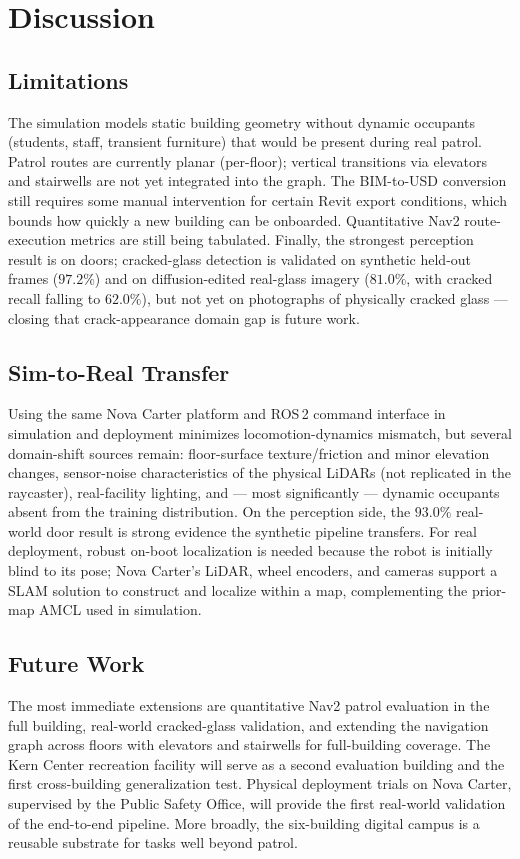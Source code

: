 \documentclass[10pt,twocolumn,letterpaper]{article}
\begin{document}
\section{Discussion}

\subsection{Limitations}
The simulation models static building geometry without dynamic occupants
(students, staff, transient furniture) that would be present during real patrol.
Patrol routes are currently planar (per-floor); vertical transitions via elevators
and stairwells are not yet integrated into the graph. The BIM-to-USD conversion
still requires some manual intervention for certain Revit export conditions, which
bounds how quickly a new building can be onboarded. Quantitative Nav2
route-execution metrics are still being tabulated. Finally, the strongest
perception result is on doors; cracked-glass detection is validated on synthetic
held-out frames ($97.2\%$) and on diffusion-edited real-glass imagery ($81.0\%$,
with cracked recall falling to $62.0\%$), but not yet on photographs of physically
cracked glass --- closing that crack-appearance domain gap is future work.

\subsection{Sim-to-Real Transfer}
Using the same Nova Carter platform and ROS\,2 command interface in simulation and
deployment minimizes locomotion-dynamics mismatch, but several domain-shift
sources remain: floor-surface texture/friction and minor elevation changes,
sensor-noise characteristics of the physical LiDARs (not replicated in the
raycaster), real-facility lighting, and --- most significantly --- dynamic
occupants absent from the training distribution. On the perception side, the
$93.0\%$ real-world door result is strong evidence the synthetic pipeline
transfers. For real deployment, robust on-boot localization is needed because the
robot is initially blind to its pose; Nova Carter's LiDAR, wheel encoders, and
cameras support a SLAM solution to construct and localize within a map,
complementing the prior-map AMCL used in simulation.

\subsection{Future Work}
The most immediate extensions are quantitative Nav2 patrol evaluation in the full
building, real-world cracked-glass validation, and extending the navigation graph
across floors with elevators and stairwells for full-building coverage. The Kern
Center recreation facility will serve as a second evaluation building and the
first cross-building generalization test. Physical deployment trials on Nova
Carter, supervised by the Public Safety Office, will provide the first real-world
validation of the end-to-end pipeline. More broadly, the six-building digital
campus is a reusable substrate for tasks well beyond patrol.
\end{document}
